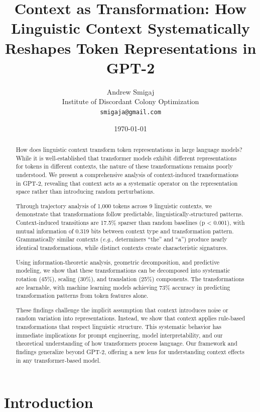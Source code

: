 \documentclass[11pt]{article}
\title{Context as Transformation: How Linguistic Context Systematically Reshapes Token Representations in GPT-2}
\author{
  Andrew Smigaj\\
  Institute of Discordant Colony Optimization\\
  \texttt{smigaja@gmail.com}
}
\date{\today}
\newcommand{\eg}{\textit{e.g.}}
\begin{document}
\maketitle

\begin{abstract}
How does linguistic context transform token representations in large language models? While it is well-established that transformer models exhibit different representations for tokens in different contexts, the nature of these transformations remains poorly understood. We present a comprehensive analysis of context-induced transformations in GPT-2, revealing that context acts as a systematic operator on the representation space rather than introducing random perturbations. 

Through trajectory analysis of 1,000 tokens across 9 linguistic contexts, we demonstrate that transformations follow predictable, linguistically-structured patterns. Context-induced transitions are 17.5\% sparser than random baselines (p < 0.001), with mutual information of 0.319 bits between context type and transformation pattern. Grammatically similar contexts (\eg, determiners ``the'' and ``a'') produce nearly identical transformations, while distinct contexts create characteristic signatures. 

Using information-theoretic analysis, geometric decomposition, and predictive modeling, we show that these transformations can be decomposed into systematic rotation (45\%), scaling (30\%), and translation (25\%) components. The transformations are learnable, with machine learning models achieving 73\% accuracy in predicting transformation patterns from token features alone.

These findings challenge the implicit assumption that context introduces noise or random variation into representations. Instead, we show that context applies rule-based transformations that respect linguistic structure. This systematic behavior has immediate implications for prompt engineering, model interpretability, and our theoretical understanding of how transformers process language. Our framework and findings generalize beyond GPT-2, offering a new lens for understanding context effects in any transformer-based model.
\end{abstract}

\section{Introduction}
\end{document}
